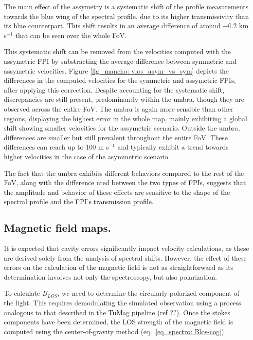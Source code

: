  The main effect of the assymetry is a systematic shift of the profile measurements towards the blue wing of the spectral profile, due to its higher transmissivity than its blue counterpart. This shift results in an average difference of around $-0.2$ km s$^{-1}$ that can be seen over the whole FoV. 

This systematic shift can be removed from the velocities computed with the assymetric FPI by substracting the average difference between symmetric and assymetric velocities. Figure \ref{fig_mancha: vlos_asym_vs_sym} depicts the differences in the computed velocities for the symmetric and assymetric FPIs, after applying this correction. Despite accounting for the systematic shift, discrepancies are still present, predominantly within the umbra, though they are observed across the entire FoV. The umbra is again more sensible than other regions, displaying the highest error in the whole map, mainly exhibiting a global shift showing smaller velocities for the assymetric scenario. Outside the umbra, differences are smaller but still prevalent throughout the entire FoV. These differences can reach up to 100 m s$^{-1}$ and typically exhibit a trend towards higher velocities in the case of the asymmetric scenario.

The fact that the umbra exhibits different behaviors compared to the rest of the FoV, along with the difference nted between the two types of FPIs, suggests that the amplitude and behavior of these effects are sensitive to the shape of the spectral profile and the FPI's transmission profile. 

\subsection{\label{sect: mancha_blos}Magnetic field maps.}

It is expected that cavity errors significantly impact velocity calculations, as these are derived solely from the analysis of spectral shifts. However, the effect of these errors on the calculation of the magnetic field is not as straightforward as its determination involves not only the spectroscopy, but also polarization. 

To calculate $B_{LOS}$, we need to determine the circularly polarized component of the light. This requires demodulating the simulated observation using a process analogous to that described in the TuMag pipeline (ref ??). Once the stokes components have been determined, the LOS strength of the magnetic field is computed using the center-of-gravity method  (eq.~\eqref{eq_spectro: Blos-cog}). 

